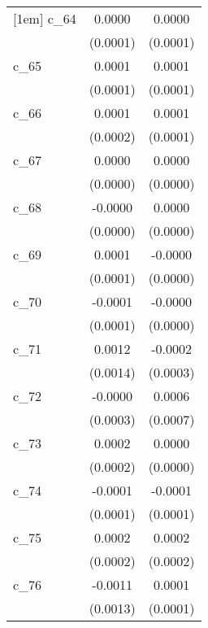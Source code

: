 {\begin{tabular}{l*{2}{c}}
[1em]
c\_64        &      0.0000        &      0.0000        \\
            &    (0.0001)        &    (0.0001)        \\
[1em]
c\_65        &      0.0001        &      0.0001        \\
            &    (0.0001)        &    (0.0001)        \\
[1em]
c\_66        &      0.0001        &      0.0001        \\
            &    (0.0002)        &    (0.0001)        \\
[1em]
c\_67        &      0.0000        &      0.0000        \\
            &    (0.0000)        &    (0.0000)        \\
[1em]
c\_68        &     -0.0000        &      0.0000        \\
            &    (0.0000)        &    (0.0000)        \\
[1em]
c\_69        &      0.0001        &     -0.0000        \\
            &    (0.0001)        &    (0.0000)        \\
[1em]
c\_70        &     -0.0001        &     -0.0000        \\
            &    (0.0001)        &    (0.0000)        \\
[1em]
c\_71        &      0.0012        &     -0.0002        \\
            &    (0.0014)        &    (0.0003)        \\
[1em]
c\_72        &     -0.0000        &      0.0006        \\
            &    (0.0003)        &    (0.0007)        \\
[1em]
c\_73        &      0.0002        &      0.0000        \\
            &    (0.0002)        &    (0.0000)        \\
[1em]
c\_74        &     -0.0001        &     -0.0001        \\
            &    (0.0001)        &    (0.0001)        \\
[1em]
c\_75        &      0.0002        &      0.0002        \\
            &    (0.0002)        &    (0.0002)        \\
[1em]
c\_76        &     -0.0011        &      0.0001        \\
            &    (0.0013)        &    (0.0001)        \\

\end{tabular}}
